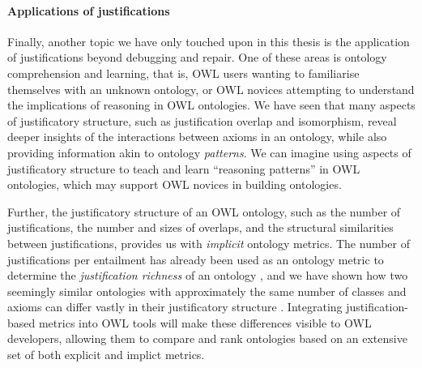 \paragraph{Applications of justifications}

Finally, another topic we have only touched upon in this thesis is the application of justifications beyond debugging and repair. One of these areas is ontology comprehension and learning, that is, OWL users wanting to familiarise themselves with an unknown ontology, or OWL novices attempting to understand the implications of reasoning in OWL ontologies. We have seen that many aspects of justificatory structure, such as justification overlap and isomorphism, reveal deeper insights of the interactions between axioms in an ontology, while also providing information akin to ontology \emph{patterns}. We can imagine using aspects of justificatory structure to teach and learn \enquote{reasoning patterns} in OWL ontologies, which may support OWL novices in building ontologies. 

Further, the justificatory structure of an OWL ontology, such as the number of justifications, the number and sizes of overlaps, and the structural similarities between justifications, provides us with \emph{implicit} ontology metrics. The number of justifications per entailment has already been used as an ontology metric to determine the \emph{justification richness} of an ontology \cite{mikroyannidi11aa}, and we have shown how two seemingly similar ontologies with approximately the same number of classes and axioms can differ vastly in their justificatory structure \cite{bail11jm}. Integrating justification-based metrics into OWL tools will make these differences visible to OWL developers, allowing them to compare and rank ontologies based on an extensive set of both explicit and implict metrics.


